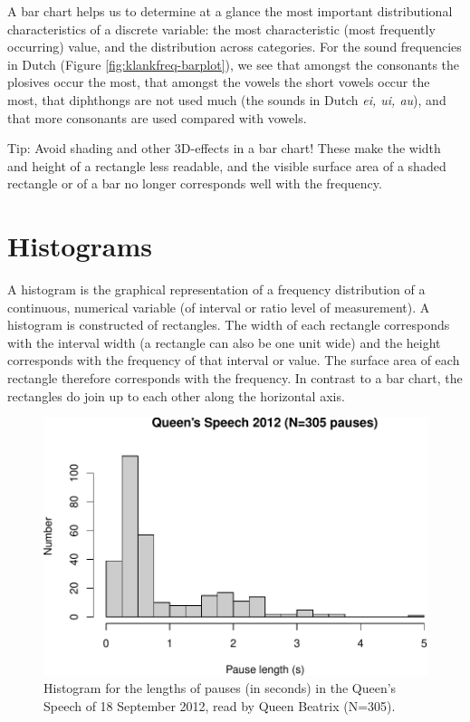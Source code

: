\documentclass[
]{book}
\begin{document}
A bar chart helps us to determine at a glance the most important
distributional characteristics of a discrete variable:
the most characteristic (most frequently occurring) value, and the
distribution across categories. For the sound frequencies
in Dutch (Figure \ref{fig:klankfreq-barplot}), we
see that amongst the consonants the plosives
occur the most, that amongst the vowels the
short vowels occur the most, that diphthongs
are not used much (the sounds in Dutch \emph{ei, ui, au}), and that
more consonants are used compared with vowels.

Tip: Avoid shading and other 3D-effects in a bar chart! These make
the width and height of a rectangle less readable, and
the visible surface area of a shaded rectangle or
of a bar no longer corresponds well with the frequency.

\hypertarget{sec:histograms}{%
\section{Histograms}\label{sec:histograms}}

A histogram is the graphical representation of a frequency distribution of
a continuous, numerical variable (of interval or ratio level of measurement).
A histogram is constructed of rectangles. The width of each
rectangle corresponds with the interval width (a rectangle can
also be one unit wide) and the height corresponds with the frequency
of that interval or value. The surface area of each rectangle
therefore corresponds with the frequency. In contrast to a
bar chart, the rectangles do join up to each other
along the horizontal axis.

\begin{figure}
\centering
\includegraphics{QMS-EN_files/figure-latex/troonrede2012-hist-1.pdf}
\caption{\label{fig:troonrede2012-hist}Histogram for the lengths of pauses (in seconds) in the Queen's Speech of 18 September 2012, read by Queen Beatrix (N=305).}
\end{figure}
\end{document}
